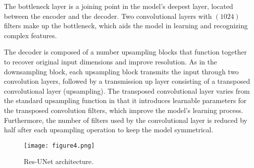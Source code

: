 The bottleneck layer is a joining point in the model's deepest layer, located between the encoder and the decoder.
Two convolutional layers with \((1024)\) filters make up the bottleneck, which aids the model in learning and recognizing complex features.

The decoder is composed of a number upsampling blocks that function together to recover original input dimensions and improve resolution.
As in the downsampling block, each upsampling block transmits the input through two convolution layers, followed by a transmission up layer consisting of a transposed convolutional layer (upsampling).
The transposed convolutional layer varies from the standard upsampling function in that it introduces learnable parameters for the transposed convolution filters, which improve the model's learning process.
Furthermore, the number of filters used by the convolutional layer is reduced by half after each upsampling operation to keep the model symmetrical.
\begin{figure} [h!]
	\begin{center}
		\texttt{[image: figure4.png]}
	\end{center}
	\caption{Res-UNet architecture.} 
	\label{fig:Unet}
\end{figure}
